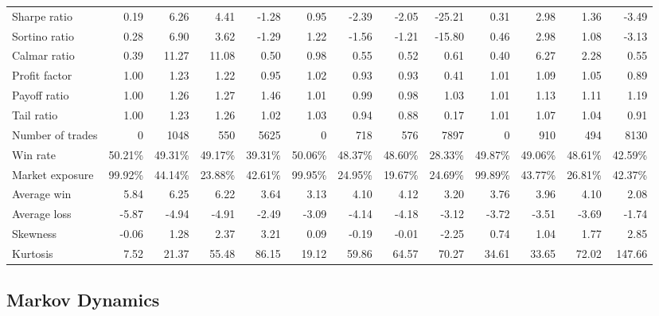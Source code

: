 \begin{table}[H]
\begin{adjustbox}{max width=\linewidth, max totalheight=0.90\textheight}
\begin{tabular}{lrrrrrrrrrrrr}
Sharpe ratio              & 0.19 & 6.26 & 4.41 & -1.28 & 0.95 & -2.39 & -2.05 & -25.21 & 0.31 & 2.98 & 1.36 & -3.49 \\
Sortino ratio             & 0.28 & 6.90 & 3.62 & -1.29 & 1.22 & -1.56 & -1.21 & -15.80 & 0.46 & 2.98 & 1.08 & -3.13 \\
Calmar ratio              & 0.39 & 11.27 & 11.08 & 0.50 & 0.98 & 0.55 & 0.52 & 0.61 & 0.40 & 6.27 & 2.28 & 0.55 \\
Profit factor             & 1.00 & 1.23 & 1.22 & 0.95 & 1.02 & 0.93 & 0.93 & 0.41 & 1.01 & 1.09 & 1.05 & 0.89 \\
Payoff ratio              & 1.00 & 1.26 & 1.27 & 1.46 & 1.01 & 0.99 & 0.98 & 1.03 & 1.01 & 1.13 & 1.11 & 1.19 \\
Tail ratio                & 1.00 & 1.23 & 1.26 & 1.02 & 1.03 & 0.94 & 0.88 & 0.17 & 1.01 & 1.07 & 1.04 & 0.91 \\
Number of trades          & 0 & 1048 & 550 & 5625 & 0 & 718 & 576 & 7897 & 0 & 910 & 494 & 8130 \\
Win rate                  & 50.21\% & 49.31\% & 49.17\% & 39.31\% & 50.06\% & 48.37\% & 48.60\% & 28.33\% & 49.87\% & 49.06\% & 48.61\% & 42.59\% \\
Market exposure           & 99.92\% & 44.14\% & 23.88\% & 42.61\% & 99.95\% & 24.95\% & 19.67\% & 24.69\% & 99.89\% & 43.77\% & 26.81\% & 42.37\% \\
Average win               & 5.84 & 6.25 & 6.22 & 3.64 & 3.13 & 4.10 & 4.12 & 3.20 & 3.76 & 3.96 & 4.10 & 2.08 \\
Average loss              & -5.87 & -4.94 & -4.91 & -2.49 & -3.09 & -4.14 & -4.18 & -3.12 & -3.72 & -3.51 & -3.69 & -1.74 \\
Skewness                  & -0.06 & 1.28 & 2.37 & 3.21 & 0.09 & -0.19 & -0.01 & -2.25 & 0.74 & 1.04 & 1.77 & 2.85 \\
Kurtosis                  & 7.52 & 21.37 & 55.48 & 86.15 & 19.12 & 59.86 & 64.57 & 70.27 & 34.61 & 33.65 & 72.02 & 147.66 \\
\bottomrule
\end{tabular}
\end{adjustbox}

\end{table}


\subsection{Markov Dynamics}

